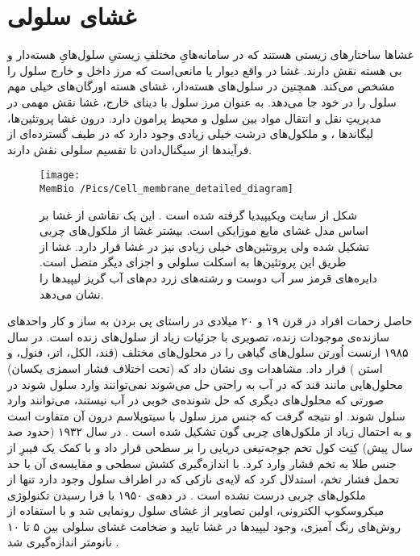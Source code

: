 \setRL


\section{\label{sec:cellmembrane}
غشای سلولی
}
غشاها ساختارهای زیستی هستند که در سامانه‌هایِ مختلفِ زیستیِ سلول‌هایِ هسته‌دار و بی هسته  نقش دارند. غشا در واقع دیوار یا مانعی‌است که مرز داخل و خارج سلول را مشخص می‌کند. همچنین در سلول‌های هسته‌دار، غشای هسته اورگان‌های خیلی مهم سلول را در خود جا می‌دهد. به عنوان مرز سلول با دینای خارج، غشا نقش مهمی در مدیریتِ نقل و انتقال مواد بین سلول و محیط پرامون دارد. درون غشا پروتئین‌ها، لیگاند‌ها
،
و ملکول‌های درشت خیلی زیادی وجود دارد که در طیف‌ گسترده‌ای از فرآیندها از سیگنال‌دادن تا تقسیم سلولی نقش دارند.
\begin{figure}[h]
\begin{center}
\texttt{[image: \\MemBio /Pics/Cell\_membrane\_detailed\_diagram]}
\caption{
شکل از سایت ویکیپیدیا گرفته شده است
\cite{wikiCellMembrane}
. این یک نقاشی از غشا بر اساس مدل غشای مایع موزایکی است. بیشتر غشا از ملکول‌های چربی تشکیل شده ولی پروتئین‌های خیلی زیادی نیز در غشا قرار دارد.  غشا از طریق این پروتئین‌ها به اسکلت سلولی و اجزای دیگر متصل است. دایره‌های قرمز سر آب دوست و رشته‌های زرد دم‌های آب گریز لیپید‌ها را نشان می‌دهد.
}
\label{fig:fluidmembranemodel}
\end{center}
\end{figure}

حاصل زحمات افراد در قرن ۱۹ و ۲۰ میلادی در راستای پی بردن به ساز و کار واحد‌های سازنده‌ی موجودات زنده، تصویری با جزئیات زیاد از سلول‌های زنده است. در سال ۱۹۸۵ ارنست اُورتن 
سلول‌های گیاهی را در محلول‌های مختلف (قند،‌ الکل، اتر، فنول، و استن
) قرار داد. مشاهدات وی نشان داد که (تحت اختلاف فشار اسمزی یکسان) محلول‌هایی مانند قند که در آب به راحتی حل می‌شوند نمی‌توانند وارد سلول شوند در صورتی که محلول‌های دیگری که حل شونده‌ی خوبی در آب نیستند، می‌توانند وارد سلول شوند. او نتیجه گرفت که جنس مرز سلول با سیتوپلاسم درون آن متفاوت است و به احتمال زیاد از ملکول‌های چربی گون تشکیل شده است
\cite{overton1985}
. در سال ۱۹۳۲ (حدود صد سال پیش) کِنِت کول
 تخم جوجه‌تیغی دریایی
را بر سطحی قرار داد و  با کمک یک فیبرِ از جنس طلا به تخم  فشار وارد کرد. با اندازه‌گیری  کشش سطحی و مقایسه‌ی آن با حد تحمل فشار تخم، استدلال کرد که لایه‌ی نازکی که در اطراف سلول وجود دارد تنها از ملکول‌های چربی درست نشده است
 \cite{Cole1932}
. در دهه‌ی ۱۹۵۰ با فرا رسیدن تکنولوژی میکروسکوپ الکترونی، اولین تصاویر از غشای سلول رونمایی شد و با استفاده از روش‌های رنگ آمیزی، وجود لیپید‌ها
 در غشا تایید و ضخامت غشای سلولی بین ۵ تا ۱۰ نانومتر اندازه‌گیری شد
\cite{ROBERTSON1959aa}
.


